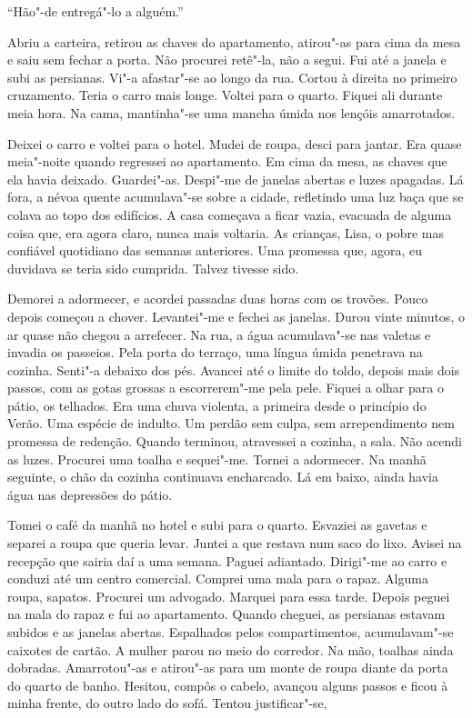 ``Hão"-de entregá"-lo a alguém.''

Abriu a carteira, retirou as chaves do apartamento, atirou"-as para cima
da mesa e saiu sem fechar a porta. Não procurei retê"-la, não a segui.
Fui até a janela e subi as persianas. Vi"-a afastar"-se ao longo da rua.
Cortou à direita no primeiro cruzamento. Teria o carro mais longe.
Voltei para o quarto. Fiquei ali durante meia hora. Na cama,
mantinha"-se uma mancha úmida nos lençóis amarrotados.

Deixei o carro e voltei para o hotel. Mudei de roupa, desci para jantar.
Era quase meia"-noite quando regressei ao apartamento. Em cima da mesa,
as chaves que ela havia deixado. Guardei"-as. Despi"-me de janelas
abertas e luzes apagadas. Lá fora, a névoa quente acumulava"-se sobre a
cidade, refletindo uma luz baça que se colava ao topo dos edifícios. A
casa começava a ficar vazia, evacuada de alguma coisa que, era agora
claro, nunca mais voltaria. As crianças, Lisa, o pobre mas confiável
quotidiano das semanas anteriores. Uma promessa que, agora, eu duvidava
se teria sido cumprida. Talvez tivesse sido.

Demorei a adormecer, e acordei passadas duas horas com os trovões. Pouco
depois começou a chover. Levantei"-me e fechei as janelas. Durou vinte
minutos, o ar quase não chegou a arrefecer. Na rua, a água acumulava"-se
nas valetas e invadia os passeios. Pela porta do terraço, uma língua
úmida penetrava na cozinha. Senti"-a debaixo dos pés. Avancei até o
limite do toldo, depois mais dois passos, com as gotas grossas a
escorrerem"-me pela pele. Fiquei a olhar para o pátio, os telhados. Era
uma chuva violenta, a primeira desde o princípio do Verão. Uma espécie
de indulto. Um perdão sem culpa, sem arrependimento nem promessa de
redenção. Quando terminou, atravessei a cozinha, a sala. Não acendi as
luzes. Procurei uma toalha e sequei"-me. Tornei a adormecer. Na manhã
seguinte, o chão da cozinha continuava encharcado. Lá em baixo, ainda
havia água nas depressões do pátio.

Tomei o café da manhã no hotel e subi para o quarto. Esvaziei as
gavetas e separei a roupa que queria levar. Juntei a que restava num
saco do lixo. Avisei na recepção que sairia daí a uma semana. Paguei
adiantado. Dirigi"-me ao carro e conduzi até um centro comercial.
Comprei uma mala para o rapaz. Alguma roupa, sapatos. Procurei um
advogado. Marquei para essa tarde. Depois peguei na mala do rapaz e fui
ao apartamento. Quando cheguei, as persianas estavam subidos e as janelas
abertas. Espalhados pelos compartimentos, acumulavam"-se caixotes de
cartão. A mulher parou no meio do corredor. Na mão, toalhas ainda
dobradas. Amarrotou"-as e atirou"-as para um monte de roupa diante da
porta do quarto de banho. Hesitou, compôs o cabelo, avançou alguns
passos e ficou à minha frente, do outro lado do sofá. Tentou
justificar"-se,

